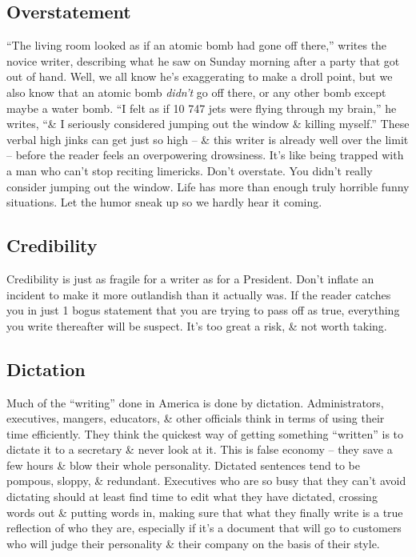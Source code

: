 \documentclass{article}
\begin{document}
\subsection{Overstatement}
``The living room looked as if an atomic bomb had gone off there,'' writes the novice writer, describing what he saw on Sunday morning after a party that got out of hand. Well, we all know he's exaggerating to make a droll point, but we also know that an atomic bomb \textit{didn't} go off there, or any other bomb except maybe a water bomb. ``I felt as if 10 747 jets were flying through my brain,'' he writes, ``\& I seriously considered jumping out the window \& killing myself.'' These verbal high jinks can get just so high -- \& this writer is already well over the limit -- before the reader feels an overpowering drowsiness. It's like being trapped with a man who can't stop reciting limericks. Don't overstate. You didn't really consider jumping out the window. Life has more than enough truly horrible funny situations. Let the humor sneak up so we hardly hear it coming.

\subsection{Credibility}
Credibility is just as fragile for a writer as for a President. Don't inflate an incident to make it more outlandish than it actually was. If the reader catches you in just 1 bogus statement that you are trying to pass off as true, everything you write thereafter will be suspect. It's too great a risk, \& not worth taking.

\subsection{Dictation}
Much of the ``writing'' done in America is done by dictation. Administrators, executives, mangers, educators, \& other officials think in terms of using their time efficiently. They think the quickest way of getting something ``written'' is to dictate it to a secretary \& never look at it. This is false economy -- they save a few hours \& blow their whole personality. Dictated sentences tend to be pompous, sloppy, \& redundant. Executives who are so busy that they can't avoid dictating should at least find time to edit what they have dictated, crossing words out \& putting words in, making sure that what they finally write is a true reflection of who they are, especially if it's a document that will go to customers who will judge their personality \& their company on the basis of their style.
\end{document}
